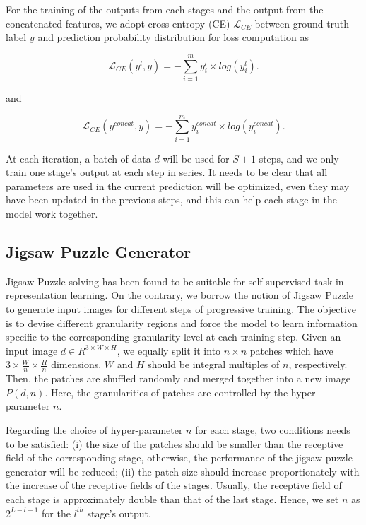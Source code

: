 \documentclass{llncs}
\begin{document}
For the training of the outputs from each stages and the output from the concatenated features, we adopt cross entropy (CE) $\mathscr{L}_{CE}$ between ground truth label $y$ and prediction probability distribution for loss computation as

\begin{equation}
    \mathscr{L}_{CE}(y^l, y) = - \sum_{i=1}^{m} y^l_i \times log(y^l_i). \label{eq:no0}
\end{equation}

and

\begin{equation}
    \mathscr{L}_{CE}(y^{concat}, y) = - \sum_{i=1}^{m} y^{concat}_i \times log(y^{concat}_i). \label{eq:no1}
\end{equation}

At each iteration, a batch of data $d$ will be used for $S+1$ steps, and we only train one stage's output at each step in series. It needs to be clear that all parameters are used in the current prediction will be optimized, even they may have been updated in the previous steps, and this can help each stage in the model work together.


\subsection{Jigsaw Puzzle Generator}


Jigsaw Puzzle solving \cite{wei2019iterative} has been found to be suitable for self-supervised task in representation learning. On the contrary, we borrow the notion of Jigsaw Puzzle to generate input images for different steps of progressive training. The objective is to devise
different granularity regions and force the model to learn information specific to the corresponding granularity level at each training step. Given an input image $d\in R^{3\times W\times H}$, we equally split it into $n \times n$ patches which have $3\times\frac{W}{n}\times\frac{H}{n}$ dimensions. $W$ and $H$ should be integral multiples of $n$, respectively. Then, the patches are shuffled randomly and merged together into a new image $P(d, n)$. Here, the granularities of patches are controlled by the hyper-parameter $n$. 


Regarding the choice of hyper-parameter $n$ for each stage, two conditions needs to be satisfied: (i) the size of the patches should be smaller than the receptive field of the corresponding stage, otherwise, the performance of the jigsaw puzzle generator will be reduced; (ii) the patch size should increase proportionately with the increase of the receptive fields of the stages. Usually, the receptive field of each stage is approximately double than that of the last stage. Hence, we set $n$ as $2^{L-l+1}$ for the $l^{th}$ stage's output. 
\end{document}
